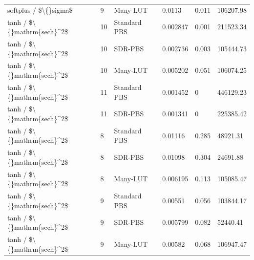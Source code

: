 \begin{tabular}{llllll}
softplus / \$\textbackslash\{\}sigma\$ & 9 & Many-LUT & 0.0113 & 0.011 & 106207.98 \\
tanh / \$\textbackslash\{\}mathrm\{sech\}^2\$ & 10 & Standard PBS & 0.002847 & 0.001 & 211523.34 \\
tanh / \$\textbackslash\{\}mathrm\{sech\}^2\$ & 10 & SDR-PBS & 0.002736 & 0.003 & 105444.73 \\
tanh / \$\textbackslash\{\}mathrm\{sech\}^2\$ & 10 & Many-LUT & 0.005202 & 0.051 & 106074.25 \\
tanh / \$\textbackslash\{\}mathrm\{sech\}^2\$ & 11 & Standard PBS & 0.001452 & 0 & 446129.23 \\
tanh / \$\textbackslash\{\}mathrm\{sech\}^2\$ & 11 & SDR-PBS & 0.001341 & 0 & 225385.42 \\
tanh / \$\textbackslash\{\}mathrm\{sech\}^2\$ & 8 & Standard PBS & 0.01116 & 0.285 & 48921.31 \\
tanh / \$\textbackslash\{\}mathrm\{sech\}^2\$ & 8 & SDR-PBS & 0.01098 & 0.304 & 24691.88 \\
tanh / \$\textbackslash\{\}mathrm\{sech\}^2\$ & 8 & Many-LUT & 0.006195 & 0.113 & 105085.47 \\
tanh / \$\textbackslash\{\}mathrm\{sech\}^2\$ & 9 & Standard PBS & 0.00551 & 0.056 & 103844.17 \\
tanh / \$\textbackslash\{\}mathrm\{sech\}^2\$ & 9 & SDR-PBS & 0.005799 & 0.082 & 52440.41 \\
tanh / \$\textbackslash\{\}mathrm\{sech\}^2\$ & 9 & Many-LUT & 0.00582 & 0.068 & 106947.47 \\
\bottomrule
\end{tabular}
